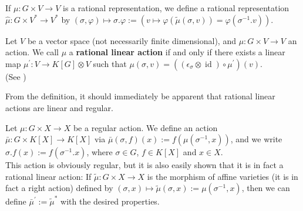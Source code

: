 \begin{definition}
  If $\mu \colon G \times V \longrightarrow V$ is a rational representation, we define a rational representation $\hat{\mu} \colon G \times V^\ast \longrightarrow V^\ast$ by $(\sigma,\varphi) \mapsto \sigma.\varphi := (v \mapsto \varphi(\tilde{\mu}(\sigma,v))= \varphi(\sigma^{-1}.v))$.
\end{definition}



\begin{definition}\label{rr}
  Let $V$ be a vector space (not necessarily finite dimensional), and $ \mu : G \times V \longrightarrow V $ an action.
  We call $ \mu $ a \textbf{rational linear action} if and only if there exists a linear map $ \mu^\prime \colon V \longrightarrow K[G] \otimes V $ such that $ \mu \left( \sigma , v \right) = \left( \left( \epsilon_\sigma \otimes \operatorname{id} \right) \circ \mu^\prime \right) \left(v\right) $.\\
  (See \cite[A.1.7]{DK15})
\end{definition}

\begin{remark}
  From the definition, it should immediately be apparent that rational linear actions are linear and regular.
\end{remark}

\begin{definition}\label{funrep}
  Let $\mu \colon G \times X \longrightarrow X$ be a regular action.
  We define an action $\bar{\mu} \colon G \times K[X] \longrightarrow K[X]$ via $\bar{\mu}(\sigma,f)(x) := f(\mu(\sigma^{-1},x))$, and we write $\sigma.f (x) := f( \sigma^{-1}.x )$, where  $\sigma \in G$, $f \in K[X]$ and $x \in X$.\\
  This action is obviously regular, but it is also easily shown that it is in fact a rational linear action:
  If $\tilde{\mu} \colon G \times X \longrightarrow X$ is the morphism of affine varieties (it is in fact a right action) defined by $ (\sigma,x)\mapsto\tilde{\mu} (\sigma,x) := \mu (\sigma^{-1},x)$, then we can define $ \bar{\mu}^\prime := \tilde{\mu}^\ast $ with the desired properties.
\end{definition}

